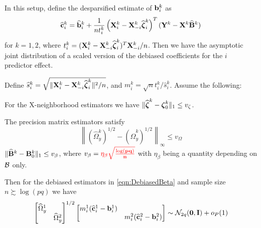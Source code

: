 \documentclass[12pt, letterpaper]{article}
\DeclareMathOperator*{\Th}{^{\text{th}}}
\numberwithin{equation}{section}
\begin{document}
In this setup, define the desparsified estimate of ${\bf{b}}_i^k$ as
%
\begin{align}\label{eqn:DebiasedBeta}
\widehat {{\bf{c}}}_i^k = \widehat {{\bf{b}}}_i^k + \frac{1}{n t_i^k} \left( {\mathbf{X}}_i^k - {\mathbf{X}}_{-i}^k \widehat {{\boldsymbol{\zeta}}}_i^k \right)^T
({\mathbf{Y}}^k - {\mathbf{X}}^k \widehat {{\mathbf{B}}}^k )
\end{align}
%
for $k = 1,2$, where $t_i^k = ( {\mathbf{X}}_i^k - {\mathbf{X}}_{-i}^k \widehat {{\boldsymbol{\zeta}}}_i^k )^T {\mathbf{X}}_{-i}^k/n$. Then we have the asymptotic joint distribution of a scaled version of the debiased coefficients for the $i\Th$ predictor effect.

\begin{Theorem}\label{Thm:ThmTesting}
Define $\widehat s_i^k = \sqrt{\| {\mathbf{X}}_i^k - {\mathbf{X}}_{-i}^k \widehat {{\boldsymbol{\zeta}}}_i^k \|^2/n}$, and $m_i^k = \sqrt n t_i^k / \widehat s_i^k$. Assume the following:

 For the X-neighborhood estimators we have $\| \widehat {{\boldsymbol{\zeta}}}^k - {\boldsymbol{\zeta}}_0^k \|_1 \leq v_\zeta$.

 The precision matrix estimators satisfy
%
$$
\left\| (\widehat \Omega_y^k)^{1/2} - (\widehat \Omega_y^k)^{1/2} \right\|_\infty \leq v_\Omega
$$
%
 $\| \widehat {{\mathbf{B}}}^k - {\mathbf{B}}^k_0 \|_1 \leq v_\beta$, where $v_\beta = { \color{red} \bf \eta_\beta \sqrt{\frac{\log (pq)}{n}}}$ with $\eta_\beta$ being a quantity depending on ${\cal{B}}$ only.

Then for the debiased estimators in \eqref{eqn:DebiasedBeta} and sample size $n \succsim \log (pq)$ we have
%
\begin{align}\label{eqn:ThmTestingEqn}
\begin{bmatrix}
\widehat \Omega_y^1 &\\
& \widehat \Omega_y^2
\end{bmatrix}^{1/2}
%
\begin{bmatrix}
m_i^1 (\widehat \bfc_i^1 - \bfb_i^1) &\\
&  m_i^2 (\widehat \bfc_i^2 - \bfb_i^2)
\end{bmatrix}
\sim \cN_{2q} ({\bf 0}, \bfI) + o_P(1)
\end{align}
%
\end{Theorem}
%
\end{document}
